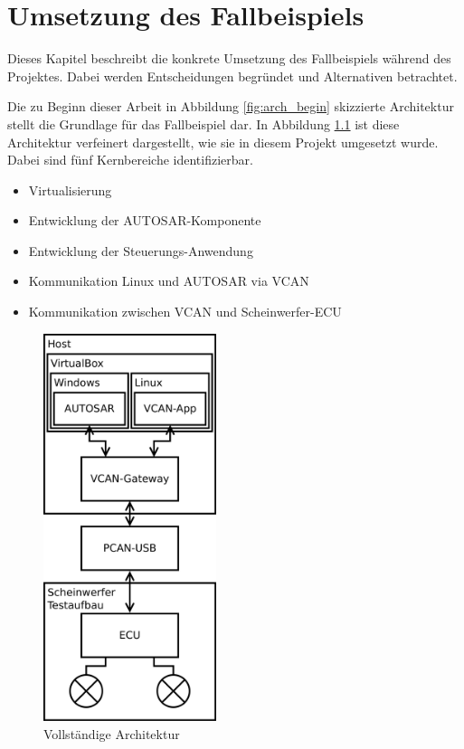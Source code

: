 \documentclass[
  a4paper,					    %
  twoside,
  DIV=calc,     				%
  bibliography=totoc,
  cleardoublepage=empty,
  ngerman,     					%
  final       					%
]{scrbook}
\begin{document}
\chapter{Umsetzung des Fallbeispiels}
\label{sec:Umsetzung_Fallbeispiel}
Dieses Kapitel beschreibt die konkrete Umsetzung des Fallbeispiels während des Projektes. Dabei werden Entscheidungen begründet und Alternativen betrachtet.

Die zu Beginn dieser Arbeit in Abbildung \ref{fig:arch_begin} skizzierte Architektur stellt die Grundlage für das Fallbeispiel dar. In Abbildung \ref{fig:arch_finished} ist diese Architektur verfeinert dargestellt, wie sie in diesem Projekt umgesetzt wurde. Dabei sind fünf Kernbereiche identifizierbar.

\begin{itemize}
    \item Virtualisierung
    \item Entwicklung der AUTOSAR-Komponente
    \item Entwicklung der Steuerungs-Anwendung
    \item Kommunikation Linux und AUTOSAR via VCAN
    \item Kommunikation zwischen VCAN und Scheinwerfer-ECU
\end{itemize}

\begin{figure}[ht]
    \centering
    \includegraphics[width=0.45\textwidth]{arch_finished}
    \caption{Vollständige Architektur}
    \label{fig:arch_finished}
\end{figure}
\end{document}
